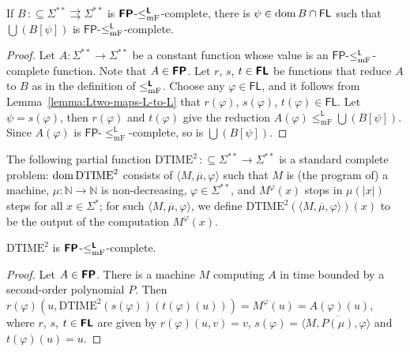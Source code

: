 \documentclass[envcountsect,envcountsame,orivec,oribibl]{llncs}
\newcommand{\N}{\mathbb N}
\newcommand{\classonefont}[1]{\mathsf{#1}}
\newcommand{\classL}{\classonefont{L}}
\newcommand{\classFL}{\classonefont{FL}}
\newcommand{\classFP}{\classonefont{FP}}
\newcommand{\classtwofont}[1]{\text{\bfseries \sffamily \upshape #1}}
\newcommand{\classLtwo}{\classtwofont{L}}
\newcommand{\classFLtwo}{\classtwofont{FL}}
\newcommand{\classFPtwo}{\classtwofont{FP}}
\newcommand{\redmF}{\leq _{\mathrm{mF}}}
\newcommand{\redLmF}{\redmF ^{\classLtwo}}
\newcommand{\LM}{\varSigma ^{**}}
\newcommand{\probDTIMEtwo}{\mathrm{DTIME}^2}
\newcommand{\probCVPtwo}{\mathrm{CVP}^2}
\newcommand{\dom}{\mathop{\rm dom}}
\newcommand{\OR}{\mathrm{OR}}
\newcommand{\NOT}{\mathrm{NOT}}
\newcommand{\AND}{\mathrm{AND}}
\newcommand{\pcolon}{\mathpunct{\,:\subseteq}}
\begin{document}
\begin{lemma}
\label{lemma:P-complete}
If $B \pcolon \LM \rightrightarrows \LM$ is $\classFPtwo$-$\redLmF$-complete, 
there is $\psi \in \dom B \cap \classFL$ such that
 $\bigcup (B[\psi])$ is $\classFP$-$\redoneLmF$-complete. 
\end{lemma}

\begin{proof}
Let $A \colon \LM \to \LM$ be a constant function 
whose value is 
an $\classFP$-$\redoneLmF$-complete function. 
Note that $A \in \classFPtwo$.
Let $r$, $s$, $t \in \classFLtwo$ be functions that reduce $A$ to $B$
as in the definition of $\redLmF$.
Choose any $\varphi \in \classFL$, 
and it follows from Lemma~\ref{lemma:Ltwo-maps-L-to-L}
that $r(\varphi)$, $s(\varphi)$, $t(\varphi) \in \classFL$.
Let $\psi = s(\varphi)$, then $r (\varphi)$ and $t (\varphi)$ 
give the reduction 
$A (\varphi) \redmF^\classL \bigcup (B[\psi])$.
Since $A(\varphi)$ is $\classFP$-$\redmF^\classL$-complete,
so is $\bigcup (B[\psi])$.
\end{proof}

The following partial function $\probDTIMEtwo \pcolon \LM \to \LM$ 
is a standard complete problem: 
$\dom \probDTIMEtwo$ consists of $\langle M, \overline \mu, \varphi \rangle$
such that $M$ is (the program of) a machine, 
$\mu \colon \N \to \N$ is non-decreasing, 
$\varphi \in \LM$, 
and $M^\varphi(x)$ stops in $\mu(|x|)$ steps for all $x \in \varSigma^*$; 
for such $\langle M, \overline \mu, \varphi \rangle$, 
we define $\probDTIMEtwo(\langle M, \overline \mu, \varphi \rangle)(x)$ to be 
the output of the computation $M^\varphi(x)$.

\begin{lemma}
\label{lemma: probDTIMEtwo}
 $\probDTIMEtwo$ is $\classFPtwo$-$\redLmF$-complete.
\end{lemma}

\begin{proof}
 Let $A \in \classFPtwo$. 
 There is a machine $M$ computing $A$
 in time bounded by a second-order polynomial $P$. 
 Then $r (\varphi) (u, \probDTIMEtwo(s(\varphi))(t(\varphi)(u))) = M ^\varphi (u) = A (\varphi) (u)$, 
 where 
 $r$, $s$, $t \in \classFLtwo$ are given by 
 $r (\varphi) (u, v) = v$, 
 $s (\varphi) = \langle M, \overline{P(\mu)}, \varphi \rangle$ and 
 $t (\varphi) (u) = u$.
\end{proof}

\end{document}
